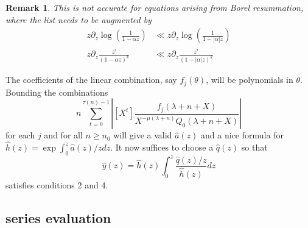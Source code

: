 \documentclass[12pt]{article}
\numberwithin{equation}{section}
\newtheorem{remark}[theorem]{Remark}
\begin{document}
\begin{remark}
This is not accurate for equations arising from Borel resummation, where the list needs to be augmented by
\begin{align*}
z \partial_z \log\left(\frac{1}{1-\alpha z}\right) &\ll z \partial_z \log\left(\frac{1}{1-|\alpha| z}\right)\\
z \partial_z \frac{z^i}{(1-\alpha z)^k} &\ll z \partial_z\frac{z^i}{(1-|\alpha| z)^k}
\end{align*}
\end{remark}

The coefficients of the linear combination, say $f_j(\theta)$, will be polynomials in $\theta$. Bounding the combinations
\begin{equation*}
n \sum_{t=0}^{\tau(n) - 1} \left| [X^t] \frac{f_j(\lambda+n+X)}{X^{-\mu(\lambda+n)} Q_0(\lambda+n+X)} \right|
\end{equation*}
for each $j$ and for all $n \ge n_0$ will give a valid $\hat{a}(z)$ and a nice formula for $\hat{h}(z) = \exp \int_0^z \hat{a}(z)/z dz$. It now suffices to choose a $\hat{q}(z)$ so that
\begin{equation*}
\hat{y}(z)=\hat{h}(z) \int_0^z \frac{\hat{q}(z)/z}{\hat{h}(z)}{dz}
\end{equation*}
satisfies conditions 2 and 4.


\subsection{series evaluation}
\end{document}
